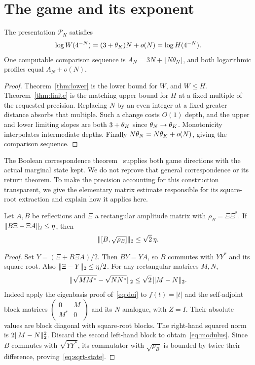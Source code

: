 \section{The game and its exponent}\label{sec:game}
\begin{corollary}\label{cor:matched}
The presentation $\mathcal P_K$ satisfies
\begin{equation}\label{eq:matched}
 \log W(4^{-N})=(3+\theta_K)N+o(N)=\log H(4^{-N}).
\end{equation}
One computable comparison sequence is $A_N=3N+\lfloor N\theta_N\rfloor$, and both logarithmic profiles equal $A_N+o(N)$.
\end{corollary}
\begin{proof}
Theorem~\ref{thm:lower} is the lower bound for $W$, and $W\le H$. Theorem~\ref{thm:finite} is the matching upper bound for $H$ at a fixed multiple of the requested precision. Replacing $N$ by an even integer at a fixed greater distance absorbs that multiple. Such a change costs $O(1)$ depth, and the upper and lower limiting slopes are both $3+\theta_K$ since $\theta_N\to\theta_K$. Monotonicity interpolates intermediate depths. Finally $N\theta_N=N\theta_K+o(N)$, giving the comparison sequence.
\end{proof}

The Boolean correspondence theorem~\cite[Theorem~4.9]{DM-precision} supplies both game directions with the actual marginal state kept. We do not reprove that general correspondence or its return theorem. To make the precision accounting for this construction transparent, we give the elementary matrix estimate responsible for its square-root extraction and explain how it applies here.

\begin{lemma}\label{lem:sqrt-state}
Let $A,B$ be reflections and $\Xi$ a rectangular amplitude matrix with $\rho_B=\Xi\Xi^*$. If $\lVert B\Xi-\Xi A\rVert_2\le\eta$, then
\begin{equation}\label{eq:sqrt-state}
 \lVert[B,\sqrt{\rho_B}]\rVert_2\le\sqrt2\,\eta.
\end{equation}
\end{lemma}
\begin{proof}
Set $Y=(\Xi+B\Xi A)/2$. Then $BY=YA$, so $B$ commutes with $YY^*$ and its square root. Also $\lVert\Xi-Y\rVert_2\le\eta/2$. For any rectangular matrices $M,N$,
\begin{equation}\label{eq:modulus}
 \lVert\sqrt{MM^*}-\sqrt{NN^*}\rVert_2\le\sqrt2\,\lVert M-N\rVert_2.
\end{equation}
Indeed apply the eigenbasis proof of~\eqref{eq:doi} to $f(t)=|t|$ and the self-adjoint block matrices $\left(\begin{smallmatrix}0&M\\M^*&0\end{smallmatrix}\right)$ and its $N$ analogue, with $Z=I$. Their absolute values are block diagonal with square-root blocks. The right-hand squared norm is $2\lVert M-N\rVert_2^2$. Discard the second left-hand block to obtain~\eqref{eq:modulus}. Since $B$ commutes with $\sqrt{YY^*}$, its commutator with $\sqrt{\rho_B}$ is bounded by twice their difference, proving~\eqref{eq:sqrt-state}.
\end{proof}

